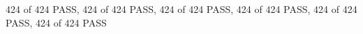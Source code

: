 424 of 424 PASS, 424 of 424 PASS, 424 of 424 PASS, 424 of 424 PASS, 424 of 424 PASS, 424 of 424 PASS